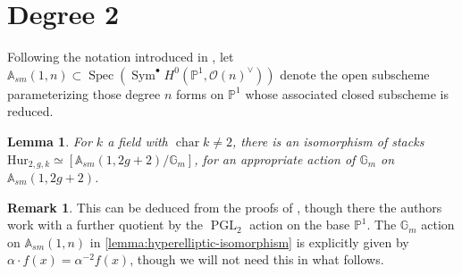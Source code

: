 \documentclass[12 pt]{amsart}
\newcommand{\rboxed}[1]{#1}
\theoremstyle{plain}
\newtheorem{lemma}[theorem]{Lemma}
\theoremstyle{definition}
\newtheorem{remark}[theorem]{Remark}
\theoremstyle{remark}
\numberwithin{equation}{section}
\newcommand\ba{\mathbb A}
\newcommand\bg{\mathbb G}
\newcommand\bp{\mathbb P}
\newcommand\sco{\mathscr O}
\DeclareMathOperator\spec{\operatorname{Spec}}
\newcommand\hur[3]{\mathrm{Hur}_{#1,#2,#3}} %
\DeclareMathOperator\sym{Sym}
\DeclareMathOperator\pgl{PGL}
\DeclareMathOperator\chr{\operatorname{char}}
\newcommand\sm{sm}
\begin{document}
\section{Degree 2} \label{section:2}

Following the notation introduced in \cite{arsieV:stacks-cyclic-covers}, let
$\rboxed{\ba_{\sm}(1,n)} \subset \spec \left( \sym^\bullet H^0(\bp^1,
	\sco(n)^\vee) \right)$ 
denote the open
subscheme parameterizing those degree $n$ forms on $\bp^1$ whose associated
closed subscheme is reduced.

\begin{lemma} \label{lemma:hyperelliptic-isomorphism} For $k$ a field with $\chr
k \neq 2$, there is an isomorphism of stacks $\hur 2 g k \simeq
[\ba_{\sm}(1,2g+2)/\bg_m]$, for an appropriate action of $\bg_m$ on
$\ba_{\sm}(1,2g+2)$.  \end{lemma} \begin{remark} \label{remark:} This can be
	deduced from the proofs of \cite[Thm.\  4.1, Cor.\
	4.7]{arsieV:stacks-cyclic-covers}, though there the authors work with a
	further quotient by the $\pgl_2$ action on the base $\bp^1$.  The
	$\bg_m$ action on $\ba_{\sm}(1,n)$ in \autoref{lemma:hyperelliptic-isomorphism}
	is explicitly given by $\alpha \cdot f(x) =
\alpha^{-2} f(x)$, though we will not need this in what follows.  \end{remark}
\end{document}
